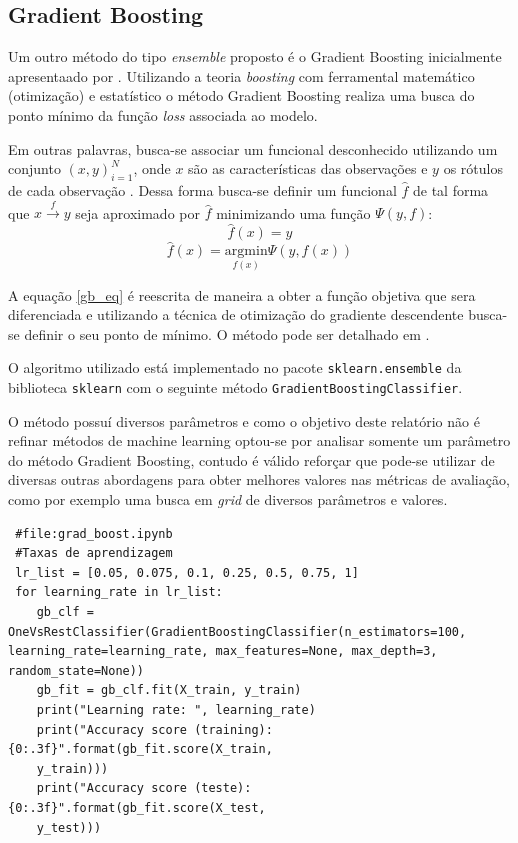 \documentclass[
	article,			%
	11pt,				%
	oneside,			%
	a4paper,			%
	english,			%
	brazil,				%
	sumario=tradicional
	]{abntex2}
\begin{document}
\subsection{Gradient Boosting}

Um outro método do tipo \textit{ensemble} proposto é o Gradient Boosting inicialmente apresentaado por \cite{Friedman2000}. Utilizando a teoria \textit{boosting} com ferramental matemático (otimização) e estatístico o método Gradient Boosting realiza uma busca do ponto mínimo da função \textit{loss} associada ao modelo.

Em outras palavras, busca-se associar um funcional desconhecido utilizando um conjunto $(x,y)_{i=1}^N$, onde  $x$ são as características das observações e $y$ os rótulos de cada observação \cite{Natekin2013}. Dessa forma busca-se definir um funcional $\hat{f}$ de tal forma que $x \xrightarrow{f} y$ seja aproximado por $\hat{f}$ minimizando uma função $\Psi(y,f)$:
\begin{equation}
 \hat{f}(x) = y
\end{equation}
\begin{equation}
\label{gb_eq}
 \hat{f}(x) = \underset{f(x)}{\mathrm{argmin}}\Psi(y,f(x))
\end{equation}

A equação \ref{gb_eq} é reescrita de maneira a obter a função objetiva que sera diferenciada e utilizando a técnica de otimização do gradiente descendente busca-se definir o seu ponto de mínimo. O método pode ser detalhado em \cite{Natekin2013}.

O algoritmo utilizado está implementado no pacote \verb|sklearn.ensemble| da biblioteca \verb|sklearn| com o seguinte método \verb|GradientBoostingClassifier|. 

O método possuí diversos parâmetros e como o objetivo deste relatório não é refinar métodos de machine learning optou-se por analisar somente um parâmetro do método Gradient Boosting, contudo é válido reforçar que pode-se utilizar de diversas outras abordagens para obter melhores valores nas métricas de avaliação, como por exemplo uma busca em \textit{grid} de diversos parâmetros e valores.

\begin{verbatim}
 #file:grad_boost.ipynb
 #Taxas de aprendizagem
 lr_list = [0.05, 0.075, 0.1, 0.25, 0.5, 0.75, 1]
 for learning_rate in lr_list:
    gb_clf = OneVsRestClassifier(GradientBoostingClassifier(n_estimators=100,                                                            learning_rate=learning_rate, max_features=None, max_depth=3, random_state=None))
    gb_fit = gb_clf.fit(X_train, y_train)
    print("Learning rate: ", learning_rate)
    print("Accuracy score (training): {0:.3f}".format(gb_fit.score(X_train,
    y_train)))
    print("Accuracy score (teste): {0:.3f}".format(gb_fit.score(X_test,
    y_test)))  
\end{verbatim}
\end{document}
